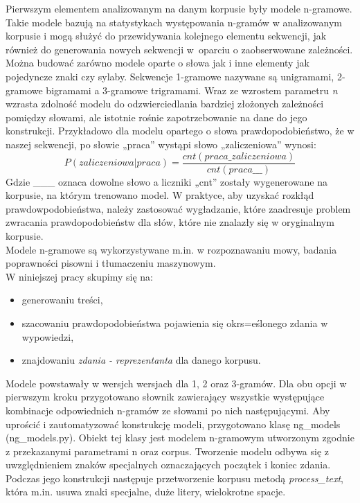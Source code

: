 \documentclass[a4paper,11pt,twoside]{report}
\theoremstyle{definition}
\begin{document}
Pierwszym elementem analizowanym na danym korpusie były modele n-gramowe. Takie modele bazują na statystykach występowania n-gramów w analizowanym korpusie i mogą służyć do przewidywania kolejnego elementu sekwencji, jak również do generowania nowych sekwencji w~oparciu o zaobserwowane zależności. Można budować zarówno modele oparte o słowa jak i inne elementy jak pojedyncze znaki czy sylaby. Sekwencje 1-gramowe nazywane są unigramami, 2-gramowe bigramami a 3-gramowe trigramami. Wraz ze wzrostem parametru \textit{n} wzrasta zdolność modelu do odzwierciedlania bardziej złożonych zależności pomiędzy słowami, ale istotnie rośnie zapotrzebowanie na dane do jego konstrukcji.
Przykładowo dla modelu opartego o słowa prawdopodobieństwo, że w naszej sekwencji, po słowie „praca” wystąpi słowo „zaliczeniowa” wynosi:
\begin{equation}
P(zaliczeniowa|praca) = \frac{cnt(praca\_ zaliczeniowa)}{cnt(praca \_\_\_)}
\end{equation}
Gdzie \_\_\_ oznaca dowolne słowo a liczniki „cnt” zostały wygenerowane na korpusie, na którym trenowano model.
W praktyce, aby uzyskać rozkłąd prawdowpodobieństwa, należy zastosować wygładzanie, które zaadresuje problem zwracania prawdopodobieństw dla słów, które nie znalazły się w oryginalnym korpusie.\\
Modele n-gramowe są wykorzystywane m.in. w rozpoznawaniu mowy, badania poprawności pisowni i tłumaczeniu maszynowym.\\
W niniejszej pracy skupimy się na:
\begin{itemize}
\item generowaniu treści,
\item szacowaniu prawdopodobieństwa pojawienia się okrs=eślonego zdania w wypowiedzi,
\item znajdowaniu \textit{zdania - reprezentanta} dla danego korpusu.
\end{itemize}

Modele powstawały w wersjch wersjach dla 1, 2 oraz 3-gramów. Dla obu opcji w pierwszym kroku przygotowano słownik zawierający wszystkie występujące kombinacje odpowiednich n-gramów ze słowami po nich następującymi. 
Aby uprościć i zautomatyzować konstrukcję modeli, przygotowano klasę ng\_models (ng\_models.py). Obiekt tej klasy jest modelem n-gramowym utworzonym zgodnie z przekazanymi parametrami n oraz corpus. Tworzenie modelu odbywa się z uwzględnieniem znaków specjalnych oznaczających początek i koniec zdania. Podczas jego konstrukcji następuje przetworzenie korpusu metodą \textit{process\_text}, która m.in. usuwa znaki specjalne, duże litery, wielokrotne spacje.
\end{document}
